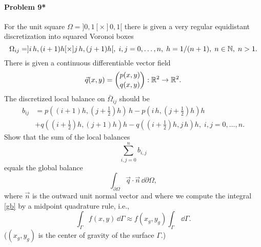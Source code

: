 \paragraph{Problem 9*}
For the unit square $\Omega = ]0,1[\times ]0,1[$ there is given
a very regular equidistant discretization into
squared Voronoi boxes
\[
\Omega_{ij} = ]i\,h,(i+1)h[\times ]j\, h,(j+1)h[,\; i,j=0,\dots,n,\; h=1/(n+1),\; n\in \mathbb{N},\; n>1.
\]
There is given a continuous differentiable vector field
\[
  \vec{q}(x,y) = \binom{p(x,y)}{q(x,y)} : \mathbb{R}^2 \rightarrow \mathbb{R}^2.
\]
The discretized local balance on $\bar\Omega_{ij}$ should be
\begin{align*}
  b_{ij} & = p((i+1)h,(j+\tfrac{1}{2})h)\,h - p(i\,h,(j+\tfrac{1}{2})h)h\\
         & + q((i+\tfrac{1}{2})h,(j+1)h)h - q((i+\tfrac{1}{2})h,j\,h)h,\; i,j=0,\dots,n.
\end{align*}
Show that the sum of the local balances
\[
\sum_{i,j=0}^n b_{i,j}
\]
equals the global balance
\begin{equation}\label{gb}
   \int_{\partial \Omega} \vec{q} \cdot \vec{n}  \, \dd\partial\Omega,
\end{equation}
where $\vec{n}$ is the outward unit normal vector and where we compute the
integral \eqref{gb} by a midpoint quadrature rule, i.e.,
\[
\int_\Gamma f(x,y) \, \dd\Gamma  \approx f(x_g,y_g) \int_\Gamma \,\dd\Gamma.
\]
($(x_g,y_g)$ is the center of gravity of the surface $\Gamma$.)



